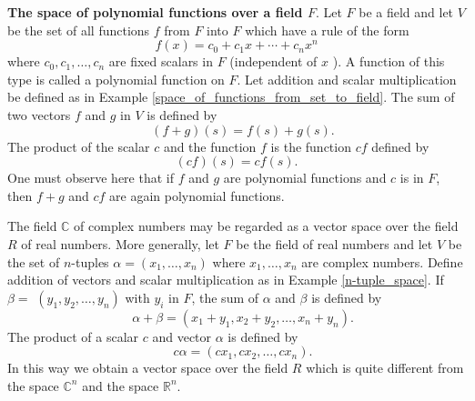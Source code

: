 \documentclass[main.tex]{subfiles}
\begin{document}
\begin{example}\label{example_4}
\textbf{The space of polynomial functions over a field $F$}. Let $F$ be a field and let $V$ be the set of all functions $f$ from $F$ into $F$ which have a rule of the form
$$
f(x)=c_0+c_1 x+\cdots+c_n x^n
$$
where $c_0, c_1, \ldots, c_n$ are fixed scalars in $F$ (independent of $x$ ). A function of this type is called a polynomial function on $F$. Let addition and scalar multiplication be defined as in Example \ref{space_of_functions_from_set_to_field}. The sum of two vectors $f$ and $g$ in $V$ is defined by
$$\quad(f+g)(s)=f(s)+g(s).$$
The product of the scalar $c$ and the function $f$ is the function $c f$ defined by
$$
(c f)(s)=c f(s) .
$$
One must observe here that if $f$ and $g$ are polynomial functions and $c$ is in $F$, then $f+g$ and $c f$ are again polynomial functions.
\end{example}

\begin{example}
The field $\mathbb{C}$ of complex numbers may be regarded as a vector space over the field $R$ of real numbers. More generally, let $F$ be the field of real numbers and let $V$ be the set of $n$-tuples $\alpha=\left(x_1, \ldots, x_n\right)$ where $x_1, \ldots, x_n$ are complex numbers. Define addition of vectors and scalar multiplication as in Example \ref{n-tuple_space}. If $\beta=$ $\left(y_1, y_2, \ldots, y_n\right)$ with $y_i$ in $F$, the sum of $\alpha$ and $\beta$ is defined by
$$\quad \alpha+\beta=\left(x_1+y_1, x_2+y_2, \ldots, x_n+y_n\right).$$
The product of a scalar $c$ and vector $\alpha$ is defined by
$$\quad c \alpha=\left(c x_1, c x_2, \ldots, c x_n\right).$$ In this way we obtain a vector space over the field $R$ which is quite different from the space $\mathbb{C}^n$ and the space $\mathbb{R}^n$.
\end{example}
\end{document}
